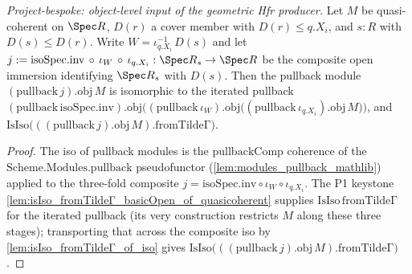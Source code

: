 \begin{lemma}
  \label{lem:pullback_composite_immersion_isIso_fromTildeΓ}
  \textit{Project-bespoke: object-level input of the geometric Hfr producer.}
  Let \(M\) be quasi-coherent on \(\Spec R\), \(D(r)\) a cover member with \(D(r) \le q.X_i\), and
  \(s : R\) with \(D(s) \le D(r)\). Write \(W = \iota_{q.X_i}^{-1}\,D(s)\) and let
  \(j := \mathrm{isoSpec}.\mathrm{inv} \,\circ\, \iota_W \,\circ\, \iota_{q.X_i} : \Spec R_s \to \Spec R\)
  be the composite open immersion identifying \(\Spec R_s\) with \(D(s)\). Then the pullback module
  \((\mathrm{pullback}\,j).\mathrm{obj}\,M\) is isomorphic to the iterated pullback
  \((\mathrm{pullback}\,\mathrm{isoSpec}.\mathrm{inv}).\mathrm{obj}\bigl((\mathrm{pullback}\,\iota_W).
  \mathrm{obj}\bigl((\mathrm{pullback}\,\iota_{q.X_i}).\mathrm{obj}\,M\bigr)\bigr)\), and
  \(\mathrm{IsIso}\bigl(((\mathrm{pullback}\,j).\mathrm{obj}\,M).\mathrm{fromTildeΓ}\bigr)\).
\end{lemma}
\begin{proof}
  The iso of pullback modules is the \(\mathrm{pullbackComp}\) coherence of the
  \(\mathrm{Scheme.Modules.pullback}\) pseudofunctor (\cref{lem:modules_pullback_mathlib}) applied to the
  three-fold composite \(j = \mathrm{isoSpec}.\mathrm{inv} \circ \iota_W \circ \iota_{q.X_i}\). The
  P1 keystone \cref{lem:isIso_fromTildeΓ_basicOpen_of_quasicoherent} supplies
  \(\mathrm{IsIso}\,\mathrm{fromTildeΓ}\) for the iterated pullback (its very construction restricts
  \(M\) along these three stages); transporting that across the composite iso by
  \cref{lem:isIso_fromTildeΓ_of_iso} gives
  \(\mathrm{IsIso}\bigl(((\mathrm{pullback}\,j).\mathrm{obj}\,M).\mathrm{fromTildeΓ}\bigr)\).
\end{proof}


